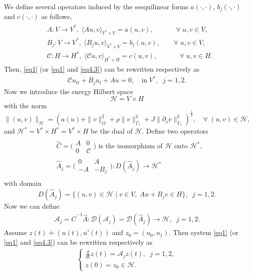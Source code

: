 \documentclass[twoside]{article}
\theoremstyle{noparens}
\theoremstyle{definition}
\numberwithin{equation}{section}
\numberwithin{figure}{section}
\begin{document}
We define several operators induced by the sesquilinear forms $a(\cdot, \cdot)$, $b_j(\cdot, \cdot)$ and $c(\cdot, \cdot)$ as follows,
	\begin{align*}
		\begin{split}
		&A :V\rightarrow V^*,\; \langle A u , v \rangle_{V^*\times V} = a(u, v),\;\qquad\quad\forall\; u, v\in V,\\
		&B_j :V\rightarrow V^*,\; \langle B_j u , v \rangle_{V^*\times V} = b_j(u, v),\qquad\forall\; u, v\in V,\\
		&\mathcal C  : H \rightarrow H^*,\; \langle \mathcal  C u , v \rangle_{H^*\times H} = c(u, v),\;\quad\qquad\forall\; u, v\in H.
		\end{split}
	\end{align*}
Then, \eqref{eq1} (or \eqref{eq1} and \eqref{eq4.3}) can be rewritten respectively as
\begin{align}
	\mathcal C u_{tt} + B_j u_t + A u = 0, \quad \mbox{in}\; V^*, \;\; j=1,2.
\end{align}
Now we introduce the energy Hilbert space
$$\mathcal{H}  = V\times H$$
with the norm
$$\|(u,v)\|_{\mathcal{H} } = ( a(u) + \|v\|_{\Omega}^2 + \rho\|v\|_{\Gamma_1}^2 + J\|\partial_{\nu}v\|_{\Gamma_1}^2 )^{\frac{1}{2}},\quad \forall\;(u,v)\in\mathcal H,$$
and $\mathcal{H} ^* = V^*\times H^*= V^*\times H$ be the dual of $\mathcal{H} $. Define two operators
\begin{align*}
	\begin{split}
		&\hat C =\Bigg(\begin{matrix}A&0\\0&\mathcal C\end{matrix}\Bigg)
		\mbox{ is the isomorphism of $\mathcal H$ onto $\mathcal H^*$},\\
		&\hat A_j =\Bigg(\begin{matrix}0&A\\-A&-B_j \end{matrix}\Bigg): D(\hat A_j)\rightarrow\mathcal H^*
	\end{split}
\end{align*}
with domain
$$D(\hat A_j )= \{(u,v)\in\mathcal H\;|\; v\in V,\;Au+B_j v\in H\},\;\; j=1,2.$$
Now we can define
\begin{align}\label{def}
	\mathcal A_j  = \hat C^{-1}\hat A: \mathcal{D}(\mathcal A_j)  = \mathcal{D}(\hat A_j )\rightarrow \mathcal H,\;\; j=1,2.
\end{align}
Assume $z(t) \doteq (u(t),u'(t))$ and $z_0 = (u_0,u_1)$. Then system \eqref{eq1} (or \eqref{eq1} and \eqref{eq4.3})  can be rewritten respectively as
\begin{align}
	\begin{cases}\displaystyle
		\frac{d}{dt}z(t) =\mathcal{A}_j  z(t),\;\; j=1,2,\\
		z(0)=z_{0}\in \mathcal{H} .
	\end{cases}
\end{align}
\end{document}
